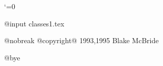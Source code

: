 
\nopagenumbers
\catcode`\@=0


@input classes1.tex


@nobreak
@copyright@ 1993,1995 Blake McBride

@bye

